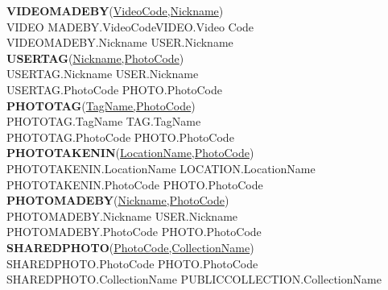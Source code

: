 \bigskip

\textbf{VIDEO\textunderscore MADE\textunderscore BY}(\underline{Video\textunderscore Code,Nickname})\\
VIDEO \textunderscore MADE\textunderscore BY.Video\textunderscore Code\leftarrow VIDEO.Video \textunderscore Code\\
VIDEO\textunderscore MADE\textunderscore BY.Nickname \leftarrow USER.Nickname\\
\bigskip
\textbf{USER\textunderscore TAG}(\underline{Nickname,Photo\textunderscore Code})\\
USER\textunderscore TAG.Nickname \leftarrow USER.Nickname\\
USER\textunderscore TAG.Photo\textunderscore Code \leftarrow PHOTO.Photo\textunderscore Code\\
\bigskip
\pagebreak
\textbf{PHOTO\textunderscore TAG}(\underline{Tag\textunderscore Name,Photo\textunderscore Code})\\
PHOTO\textunderscore TAG.Tag\textunderscore Name \leftarrow TAG.Tag\textunderscore Name\\
PHOTO\textunderscore TAG.Photo\textunderscore Code \leftarrow PHOTO.Photo\textunderscore Code\\

\bigskip
\textbf{PHOTO\textunderscore TAKEN\textunderscore IN}(\underline{Location\textunderscore Name,Photo\textunderscore Code})\\
PHOTO\textunderscore TAKEN\textunderscore IN.Location\textunderscore Name \leftarrow LOCATION.Location\textunderscore Name \\
PHOTO\textunderscore TAKEN\textunderscore IN.Photo\textunderscore Code \leftarrow PHOTO.Photo\textunderscore Code\\
\bigskip
\textbf{PHOTO\textunderscore MADE\textunderscore BY}(\underline{Nickname,Photo\textunderscore Code})\\
PHOTO\textunderscore MADE\textunderscore BY.Nickname \leftarrow USER.Nickname \\
PHOTO\textunderscore MADE\textunderscore BY.Photo\textunderscore Code \leftarrow PHOTO.Photo\textunderscore Code\\
\bigskip
\textbf{SHARED\textunderscore PHOTO}(\underline{Photo\textunderscore Code,Collection\textunderscore Name})\\
SHARED\textunderscore PHOTO.Photo\textunderscore Code \leftarrow  PHOTO.Photo\textunderscore Code\\
SHARED\textunderscore PHOTO.Collection\textunderscore Name \leftarrow PUBLIC\textunderscore COLLECTION.Collection\textunderscore Name \\

